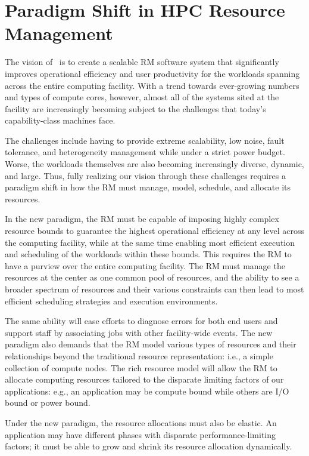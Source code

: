 \section{Paradigm Shift in HPC Resource Management}
The vision of \flux\ is to create a scalable RM
software system that significantly improves
operational efficiency and user productivity
for the workloads spanning across the entire
computing facility.
With a trend towards ever-growing numbers and
types of compute cores, however, almost all of 
the systems sited at the facility are increasingly
becoming subject to the challenges
that today's capability-class machines face.
\ifcomments
{}

The challenges include having to provide extreme
scalability, low noise, fault tolerance, 
and heterogeneity management while under a strict power budget.
Worse, the workloads themselves are also becoming
increasingly diverse, dynamic, and large.
Thus, fully realizing our vision through
these challenges requires a paradigm shift
in how the RM must manage, model, schedule, 
and allocate its resources.

In the new paradigm, the RM must be capable of
imposing highly complex resource bounds
to guarantee the highest operational efficiency
at any level across the computing facility, 
while at the same time enabling most efficient
execution and scheduling of the workloads
within these bounds.
This requires the RM to have a purview over 
the entire computing facility. 
The RM must manage the resources at the center
as one common pool of resources, and the ability
to see a broader spectrum of resources
and their various constraints can then lead to
most efficient scheduling strategies
and execution environments. 

The same ability will ease efforts to diagnose errors
for both end users and support staff by associating jobs
with other facility-wide events. The new paradigm 
also demands that the RM model various types of
resources and their relationships beyond the traditional
resource representation: i.e., a simple collection
of compute nodes. The rich resource model will allow
the RM to allocate computing resources tailored
to the disparate limiting factors
of our applications: e.g., an application
may be compute bound while others are I/O bound 
or power bound.

Under the new paradigm, the resource allocations
must also be elastic. An application may have different
phases with disparate performance-limiting factors;
it must be able to grow and shrink its resource allocation
dynamically.


